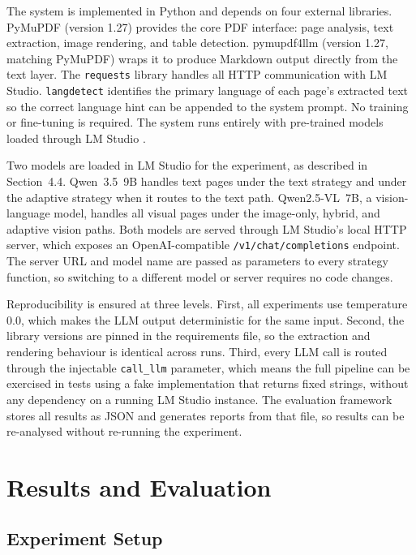\documentclass[12pt]{article}
\begin{document}
The system is implemented in Python and depends on four external libraries.
PyMuPDF \cite{pymupdf} (version 1.27) provides the core PDF interface: page analysis, text extraction, image rendering, and table detection.
pymupdf4llm \cite{pymupdf4llm} (version 1.27, matching PyMuPDF) wraps it to produce Markdown output directly from the text layer.
The \texttt{requests} library handles all HTTP communication with LM Studio.
\texttt{langdetect} identifies the primary language of each page's extracted text so the correct language hint can be appended to the system prompt.
No training or fine-tuning is required. The system runs entirely with pre-trained models loaded through LM Studio \cite{lmstudio}.

Two models are loaded in LM Studio for the experiment, as described in Section~4.4.
Qwen~3.5~9B handles text pages under the text strategy and under the adaptive strategy when it routes to the text path.
Qwen2.5-VL~7B, a vision-language model, handles all visual pages under the image-only, hybrid, and adaptive vision paths.
Both models are served through LM Studio's local HTTP server, which exposes an OpenAI-compatible \texttt{/v1/chat/completions} endpoint.
The server URL and model name are passed as parameters to every strategy function, so switching to a different model or server requires no code changes.

Reproducibility is ensured at three levels.
First, all experiments use temperature 0.0, which makes the LLM output deterministic for the same input.
Second, the library versions are pinned in the requirements file, so the extraction and rendering behaviour is identical across runs.
Third, every LLM call is routed through the injectable \texttt{call\_llm} parameter, which means the full pipeline can be exercised in tests using a fake implementation that returns fixed strings, without any dependency on a running LM Studio instance.
The evaluation framework stores all results as JSON and generates reports from that file, so results can be re-analysed without re-running the experiment.


\section{Results and Evaluation}

\subsection{Experiment Setup}
\end{document}
